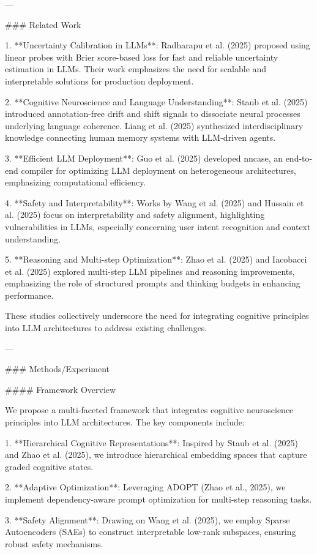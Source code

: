 ---

### Related Work

1. **Uncertainty Calibration in LLMs**: Radharapu et al. (2025) proposed using linear probes with Brier score-based loss for fast and reliable uncertainty estimation in LLMs. Their work emphasizes the need for scalable and interpretable solutions for production deployment.

2. **Cognitive Neuroscience and Language Understanding**: Staub et al. (2025) introduced annotation-free drift and shift signals to dissociate neural processes underlying language coherence. Liang et al. (2025) synthesized interdisciplinary knowledge connecting human memory systems with LLM-driven agents.

3. **Efficient LLM Deployment**: Guo et al. (2025) developed nncase, an end-to-end compiler for optimizing LLM deployment on heterogeneous architectures, emphasizing computational efficiency.

4. **Safety and Interpretability**: Works by Wang et al. (2025) and Hussain et al. (2025) focus on interpretability and safety alignment, highlighting vulnerabilities in LLMs, especially concerning user intent recognition and context understanding.

5. **Reasoning and Multi-step Optimization**: Zhao et al. (2025) and Iacobacci et al. (2025) explored multi-step LLM pipelines and reasoning improvements, emphasizing the role of structured prompts and thinking budgets in enhancing performance.

These studies collectively underscore the need for integrating cognitive principles into LLM architectures to address existing challenges.

---

### Methods/Experiment

#### Framework Overview

We propose a multi-faceted framework that integrates cognitive neuroscience principles into LLM architectures. The key components include:

1. **Hierarchical Cognitive Representations**: Inspired by Staub et al. (2025) and Zhao et al. (2025), we introduce hierarchical embedding spaces that capture graded cognitive states.

2. **Adaptive Optimization**: Leveraging ADOPT (Zhao et al., 2025), we implement dependency-aware prompt optimization for multi-step reasoning tasks.

3. **Safety Alignment**: Drawing on Wang et al. (2025), we employ Sparse Autoencoders (SAEs) to construct interpretable low-rank subspaces, ensuring robust safety mechanisms.

